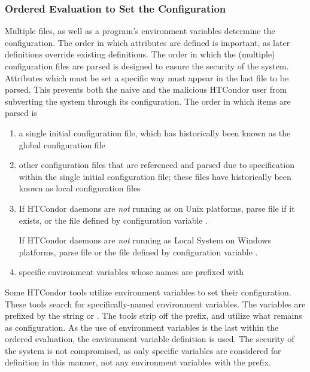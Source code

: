\subsubsection{\label{sec:Ordering-Config-File}Ordered Evaluation to
Set the Configuration} 

Multiple files, as well as a program's environment variables
determine the configuration.
The order in which attributes are defined is important, as later
definitions override existing definitions.
The order in which the (multiple) configuration files are parsed 
is designed to ensure the security of the system.
Attributes which must be set a specific way 
must appear in the last file to be parsed.
This prevents both the naive and the malicious HTCondor user 
from subverting the system through its configuration.
The order in which items are parsed is
\begin{enumerate}
\item a single initial configuration file, which has historically
been known as the global configuration file
\item other configuration files that are referenced and parsed due 
to specification within the single initial configuration file;
these files have historically been known as local configuration files
\item If HTCondor daemons are \emph{not} running as  on
Unix platforms,
parse file  if it exists,
or the file defined by configuration variable .

If HTCondor daemons are \emph{not} running as Local System on 
Windows platforms,
parse file \verb@%USERPROFILE\.condor\user_config@ if it exists,
or the file defined by configuration variable .

\item specific environment variables whose names are
prefixed with 
\end{enumerate}


Some HTCondor tools utilize environment variables to set their
configuration.
These tools search for specifically-named environment variables.
The variables are prefixed by the string 
or .
The tools strip off the prefix, and utilize what remains
as configuration.
As the use of environment variables is the last within
the ordered evaluation, 
the environment variable definition is used.
The security of the system is not compromised,
as only specific variables are considered for definition
in this manner, not any environment variables with
the  prefix.

